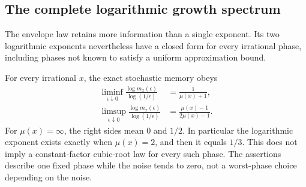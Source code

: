 \subsection{The complete logarithmic growth spectrum}
The envelope law retains more information than a single exponent. Its two logarithmic exponents nevertheless have a closed form for every irrational phase, including phases not known to satisfy a uniform approximation bound.

\begin{theorem}\label{thm:r71-exponents}
For every irrational $x$, the exact stochastic memory obeys
\begin{align}
 \liminf_{\epsilon\downarrow0}
  \frac{\log m_x(\epsilon)}{\log(1/\epsilon)}
     &=\frac1{\mu(x)+1},\label{eq:r71-liminf}\\
 \limsup_{\epsilon\downarrow0}
  \frac{\log m_x(\epsilon)}{\log(1/\epsilon)}
     &=\frac{\mu(x)-1}{2\mu(x)-1}.\label{eq:r71-limsup}
\end{align}
For $\mu(x)=\infty$, the right sides mean $0$ and $1/2$. In particular the logarithmic exponent exists exactly when $\mu(x)=2$, and then it equals $1/3$. This does not imply a constant-factor cubic-root law for every such phase. The assertions describe one fixed phase while the noise tends to zero, not a worst-phase choice depending on the noise.
\end{theorem}
